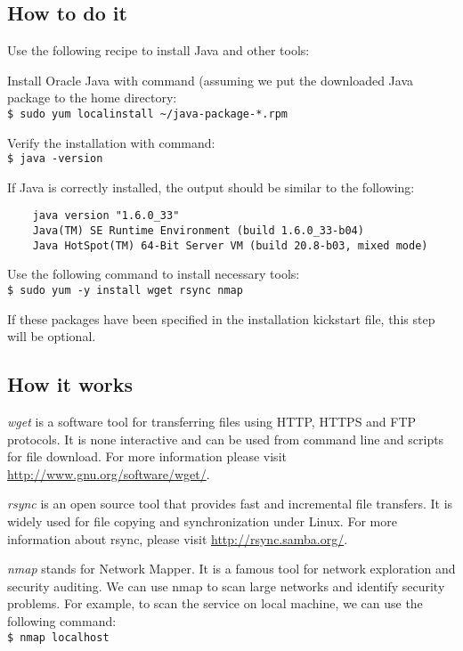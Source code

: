 \subsection*{How to do it}
Use the following recipe to install Java and other tools:

Install Oracle Java with command (assuming we put the downloaded Java package to the home directory: \\
\verb|$ sudo yum localinstall ~/java-package-*.rpm|

Verify the installation with command: \\
\verb|$ java -version|

If Java is correctly installed, the output should be similar to the following: \\
\begin{verbatim}
    java version "1.6.0_33"
    Java(TM) SE Runtime Environment (build 1.6.0_33-b04)
    Java HotSpot(TM) 64-Bit Server VM (build 20.8-b03, mixed mode)
\end{verbatim}

Use the following command to install necessary tools: \\
\verb|$ sudo yum -y install wget rsync nmap|

If these packages have been specified in the installation kickstart file, this step will be optional.

\subsection*{How it works}
\emph{wget} is a software tool for transferring files using HTTP, HTTPS and FTP protocols. It is none interactive and can be used from command line and scripts for file download. For more information please visit \href{http://www.gnu.org/software/wget/}{http://www.gnu.org/software/wget/}.

\emph{rsync} is an open source tool that provides fast and incremental file transfers. It is widely used for file copying and synchronization under Linux. For more information about rsync, please visit \href{http://rsync.samba.org/}{http://rsync.samba.org/}.

\emph{nmap} stands for Network Mapper. It is a famous tool for network exploration and security auditing. We can use nmap to scan large networks and identify security problems. For example, to scan the service on local machine, we can use the following command:\\
\verb|$ nmap localhost|

